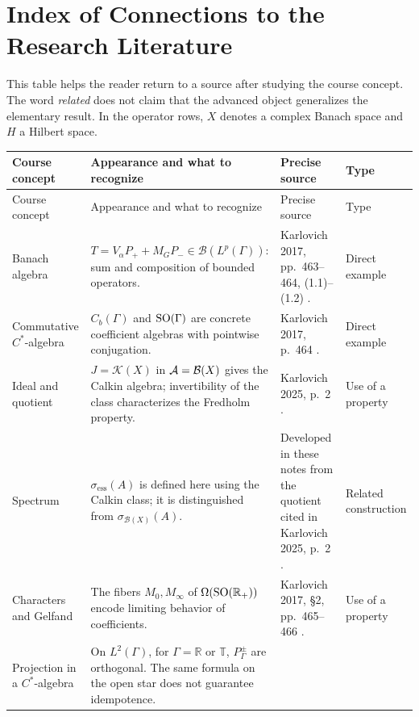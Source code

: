 \chapter*{Index of Connections to the Research Literature}

This table helps the reader return to a source after studying the course concept.
The word \emph{related} does not claim that the advanced object generalizes the
elementary result. In the operator rows, $X$ denotes a complex Banach space and
$H$ a Hilbert space.

\footnotesize
\begin{longtable}{>{\raggedright\arraybackslash}p{2.5cm}>{\raggedright\arraybackslash}p{5.5cm}>{\raggedright\arraybackslash}p{3.6cm}>{\raggedright\arraybackslash}p{2.0cm}}
\toprule
Course concept & Appearance and what to recognize & Precise source & Type\\
\midrule
\endfirsthead
\toprule
Course concept & Appearance and what to recognize & Precise source & Type\\
\midrule
\endhead
Banach algebra &
$T=V_\alpha P_++M_GP_-\in\mathcal B(L^p(\Gamma))$:
sum and composition of bounded operators. &
Karlovich 2017, pp.~463--464, (1.1)--(1.2) \cite{Karlovich2017}. &
Direct example\\
Commutative $C^*$-algebra &
$C_b(\Gamma)$ and $\operatorname{SO}(\Gamma)$ are concrete coefficient algebras
with pointwise conjugation. &
Karlovich 2017, p.~464 \cite{Karlovich2017}. &
Direct example\\
Ideal and quotient &
$J=\mathcal K(X)$ in $\mathcal A=\mathcal B(X)$ gives the Calkin algebra;
invertibility of the class characterizes the Fredholm property. &
Karlovich 2025, p.~2 \cite{Karlovich2025}. &
Use of a property\\
Spectrum &
$\sigma_{\mathrm{ess}}(A)$ is defined here using the Calkin class;
it is distinguished from $\sigma_{\mathcal B(X)}(A)$. &
Developed in these notes from the quotient cited in Karlovich 2025, p.~2 \cite{Karlovich2025}. &
Related construction\\
Characters and Gelfand &
The fibers $M_0,M_\infty$ of $\Omega(\operatorname{SO}(\mathbb R_+))$ encode
limiting behavior of coefficients. &
Karlovich 2017, §2, pp.~465--466 \cite{Karlovich2017}. &
Use of a property\\
Projection in a $C^*$-algebra &
On $L^2(\Gamma)$, for $\Gamma=\mathbb R$ or $\mathbb T$,
$P_\Gamma^\pm$ are orthogonal.
The same formula on the open star does not guarantee idempotence. &

\end{longtable}
